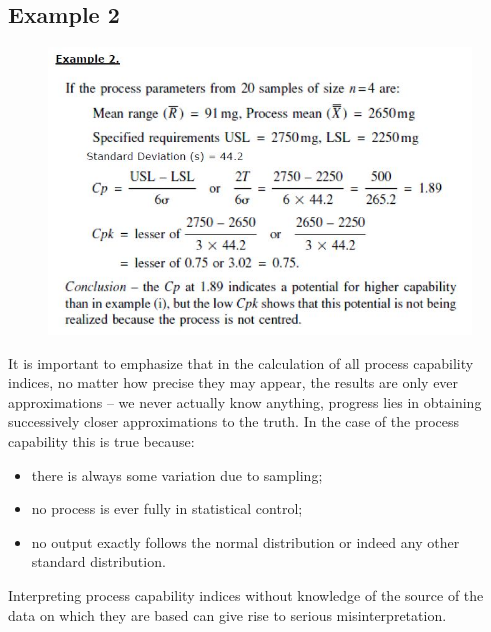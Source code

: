 \documentclass[11pt]{article} %
\begin{document}
\newpage					
					\subsection*{Example 2}
					
					\begin{figure}[h!]
						\centering
						\includegraphics[width=1\linewidth]{proccapindices/Example2}
					\end{figure}
					
{
	\normalsize
					
\noindent It is important to emphasize that in the calculation of all process capability indices, no matter how precise they may appear, the results are only ever approximations – we never actually know anything, progress lies in obtaining successively closer approximations to the truth. In the case of the process capability this is true because:
					\begin{itemize}
						\item	there is always some variation due to sampling;
						\item	no process is ever fully in statistical control;
						\item	no output exactly follows the normal distribution or indeed any other standard distribution.
					\end{itemize}
					
				
					Interpreting process capability indices without knowledge of the source of the data on which they are based can give rise to serious misinterpretation.
}
\newpage
					
\end{document}
